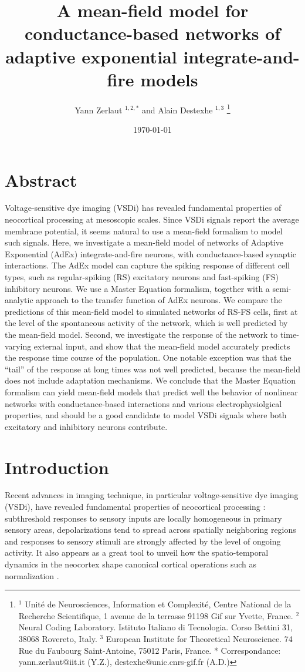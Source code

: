 \documentclass[8pt, colorlinks, a4paper]{article}
\author{Yann Zerlaut \(^{1,2,*}\) and Alain Destexhe \(^{1,3}\)
  \footnote{$^1$ Unit\'e de Neurosciences, Information et
    Complexit\'e, Centre National de la Recherche Scientifique, 1
    avenue de la terrasse 91198 Gif sur Yvette, France. $^2$ Neural
    Coding Laboratory. Istituto Italiano di Tecnologia. Corso Bettini
    31, 38068 Rovereto, Italy. $^3$ European Institute for Theoretical
    Neuroscience. 74 Rue du Faubourg Saint-Antoine, 75012 Paris,
    France. * Correspondance: yann.zerlaut@iit.it (Y.Z.),
    destexhe@unic.cnrs-gif.fr (A.D.) \normalsize }}
\date{\today}
\title{A mean-field model for conductance-based networks of adaptive
  exponential integrate-and-fire models}
\begin{document}
\maketitle

\linenumbers

\section{Abstract}
\label{sec-1}
\bfseries

Voltage-sensitive dye imaging (VSDi) has revealed fundamental properties of neocortical processing at mesoscopic scales.  Since VSDi signals report the average membrane potential, it seems natural to use a mean-field formalism to model such signals.  Here, we investigate a mean-field model of networks of Adaptive Exponential (AdEx) integrate-and-fire neurons, with conductance-based synaptic interactions.  The AdEx model can capture the spiking response of different cell types, such as regular-spiking (RS) excitatory neurons and fast-spiking (FS) inhibitory neurons.  We use a Master Equation formalism, together with a semi-analytic approach to the transfer function of AdEx neurons.  We compare the predictions of this mean-field model to simulated networks of RS-FS cells, first at the level of the spontaneous activity of the network, which is well predicted by the mean-field model.  Second, we investigate the response of the network to time-varying external input, and show that the mean-field model accurately predicts the response time course of the population.  One notable exception was that the ``tail'' of the response at long times was not well predicted, because the mean-field does not include adaptation mechanisms.  We conclude that the Master Equation formalism can yield mean-field models that predict well the behavior of nonlinear networks with conductance-based interactions and various electrophysiolgical properties, and should be a good candidate to model VSDi signals where both excitatory and inhibitory neurons contribute.

\normalfont

\section{Introduction}
\label{sec-2}
\normalfont

Recent advances in imaging technique, in particular voltage-sensitive
dye imaging (VSDi), have revealed fundamental properties of
neocortical processing
\cite{Arieli1996,Contreras2001,Petersen2001,Ferezou2006,Civillico2012}:
subthreshold responses to sensory inputs are locally homogeneous in
primary sensory areas, depolarizations tend to spread across spatially
neighboring regions and responses to sensory stimuli are strongly
affected by the level of ongoing activity. It also appears as a great
tool to unveil how the spatio-temporal dynamics in the neocortex shape
canonical cortical operations such as normalization
\cite{Reynaud2012}.
\end{document}

